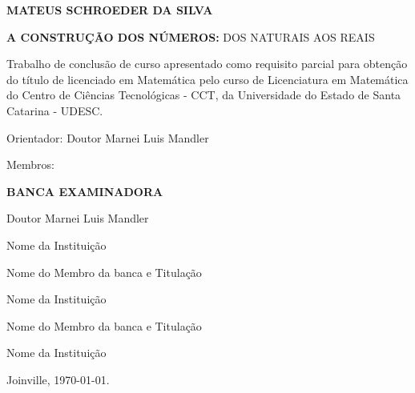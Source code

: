 \documentclass[
	12pt,				%
	oneside,			%
	a4paper,			%
	english,			%
	french,				%
	spanish,			%
	brazil,				%
	]{abntex2}
\theoremstyle{plain}
\theoremstyle{definition}
\newcommand{\authorName}{MATEUS SCHROEDER DA SILVA}
\newcommand{\orientationBy}{Doutor Marnei Luis Mandler}
\newcommand{\titleTGR}{A CONSTRUÇÃO DOS NÚMEROS}
\newcommand{\subtitleTGR}{DOS NATURAIS AOS REAIS}
\newcommand{\titleComplete}{\textbf{\titleTGR:} \subtitleTGR}
\begin{document}

%
% 


\begin{folhadeaprovacao}

  \begin{center}
    \textbf{\authorName}
\vspace {1 cm}

   \titleComplete 
   \vspace {1 cm}
  \end{center}
    
\begin{flushright}
  \begin{minipage}[t]{8 cm}
  { Trabalho de conclusão de curso apresentado como requisito parcial para obtenção do título de licenciado em Matemática pelo curso de Licenciatura em Matemática do Centro de Ciências Tecnológicas - CCT, da Universidade do Estado de Santa Catarina - UDESC. 

 Orientador: \orientationBy}
 
  \end{minipage}
  \end{flushright}
     
     \begin{minipage}[c]{3cm} 
	Membros:
\end{minipage}
\begin{minipage}[c]{8 cm}
	\begin{center}
	\textbf{BANCA EXAMINADORA}
	\vspace {2 cm}
	
    \orientationBy
	
    Nome da Instituição
    
    \vspace {1.5 cm}
    
    Nome do Membro da banca e Titulação
	
    Nome da Instituição
    
    \vspace {1.5 cm}
    
    Nome do Membro da banca e Titulação
	
    Nome da Instituição
    \vspace {1.5 cm}
    
    
\end{center}

\end{minipage}

\vspace*{\fill}
     \begin{center}
	     Joinville, \today.
\end{center}

    
\end{folhadeaprovacao}
\end{document}

